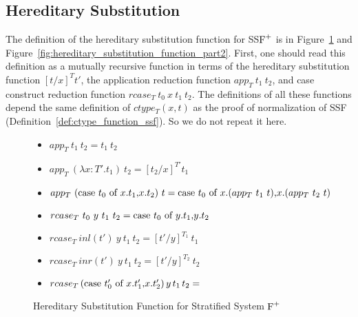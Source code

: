 \subsection{Hereditary Substitution}
\label{sec:the_hereditary_substitution_function_ssfp}

The definition of the hereditary substitution function for SS$\mbox{F}^{+}$ is
in Figure~\ref{fig:hereditary_substitution_function_part1} and
Figure~\ref{fig:hereditary_substitution_function_part2}.  First, one
should read this definition as a mutually recursive function in terms
of the hereditary substitution function $[t/x]^T t'$, the
application reduction function $app_T\ t_1\ t_2$, and case
construct reduction function $rcase_T\ t_0\ x\ t_1\ t_2$.  The
definitions of all these functions depend the same definition of
$ctype_T(x, t)$ as the proof of normalization of SSF
(Definition~\ref{def:ctype_function_ssf}).  So we do not repeat it
here.
\begin{figure}
  \begin{itemize}
  \item[] $app_T\ t_1\ t_2 = t_1\ t_2$
    
  \item[] $app_T\ (\lambda x:T'.t_1)\ t_2 = [t_2/x]^{T'} t_1$
  \item[] $app_T\ (\mbox{case}\ t_0\ \text{of}\ x\text{.}t_1\text{,}x\text{.}t_2)\ t = 
    \mbox{case}\ t_0\ \text{of}\ x\text{.}(app_T\ t_1\ t)\text{,}x\text{.}(app_T\ t_2\ t)$
  \end{itemize}
  
  \begin{itemize}
  \item[] $rcase_{T}\ t_0\ y\ t_1\ t_2 = \mbox{case}\ t_0\ \text{of}\ y\text{.}t_1\text{,}y\text{.}t_2$
  \item[] $rcase_{T}\ inl(t')\ y\ t_1\ t_2 = [t'/y]^{T_1}\ t_1$
  \item[] $rcase_{T}\ inr(t')\ y\ t_1\ t_2 = [t'/y]^{T_2}\ t_2$
  \item[] $rcase_{T}\,(\mbox{case}\ t'_0\ \text{of}\ x\text{.}t'_1\text{,}x\text{.}t'_2)\,y\,t_1\,t_2 =$\\
    \vspace{-15px}
  \end{itemize}
  \caption{Hereditary Substitution Function for Stratified System $\mbox{F}^{+}$}
  \label{fig:hereditary_substitution_function_part1}
\end{figure}

